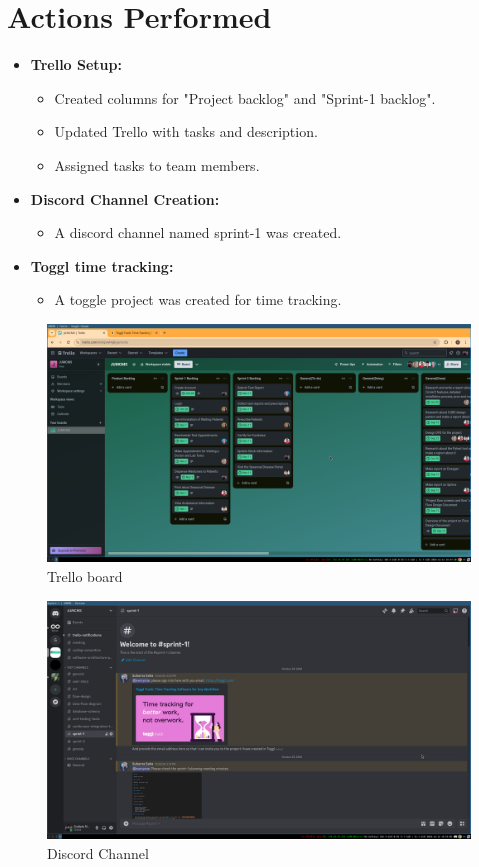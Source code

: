 \documentclass[a4paper,12pt]{article}
\begin{document}
\section{Actions Performed}
\begin{itemize}
    \item \textbf{Trello Setup:}
        \begin{itemize}
            \item Created columns for "Project backlog" and "Sprint-1 backlog".
            \item Updated Trello with tasks and description. 
            \item Assigned tasks to team members.
        \end{itemize}
    \item \textbf{Discord Channel Creation:}
        \begin{itemize}
            \item A discord channel named sprint-1 was created.
        \end{itemize}
    \item \textbf{Toggl time tracking:}
        \begin{itemize}
            \item A toggle project was created for time tracking.
        \end{itemize}
\end{itemize}
\begin{figure}[H]
    \centering
    \includegraphics[width=\textwidth]{trello.png}
    \caption{Trello board}
\end{figure}

\begin{figure}[H]
    \centering
    \includegraphics[width=\textwidth]{discord.png}
    \caption{Discord Channel}
\end{figure}
\end{document}
